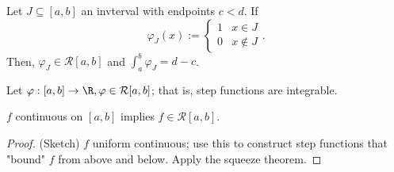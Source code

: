 \begin{lemma}[BS-7.2.4]
    Let $J \subseteq [a, b]$ an invterval with endpoints $c < d$. If $$\varphi_J(x) := \begin{cases}
        1 & x \in J\\
        0 & x \notin J
    \end{cases}.$$ Then, $\varphi_J \in \mathcal{R}[a, b]$ and $\int_a^b \varphi_J = d- c$.
\end{lemma}

\begin{theorem}
    Let $\varphi : [a, b] \to \R, \varphi \in \mathcal{R}[a,b]$; that is, step functions are integrable.
\end{theorem}

\begin{theorem}
    $f$ continuous on $[a, b]$ implies $f \in \mathcal{R}[a, b]$.
\end{theorem}
\begin{proof}(Sketch)
    $f$ uniform continuous; use this to construct step functions that "bound" $f$ from above and below. Apply the squeeze theorem.
\end{proof}